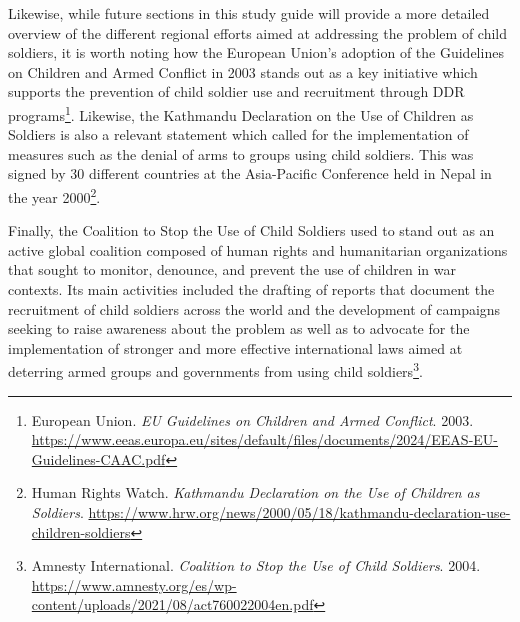 Likewise, while future sections in this study guide will provide a more detailed overview of the different regional efforts aimed at addressing the problem of child soldiers, it is worth noting how the European Union’s adoption of the Guidelines on Children and Armed Conflict in 2003 stands out as a key initiative which supports the prevention of child soldier use and recruitment through DDR programs\footnote{European Union. \emph{EU Guidelines on Children and Armed Conflict}. 2003. \url{https://www.eeas.europa.eu/sites/default/files/documents/2024/EEAS-EU-Guidelines-CAAC.pdf}}. Likewise, the Kathmandu Declaration on the Use of Children as Soldiers is also a relevant statement which called for the implementation of measures such as the denial of arms to groups using child soldiers. This was signed by 30 different countries at the Asia-Pacific Conference held in Nepal in the year 2000\footnote{Human Rights Watch. \emph{Kathmandu Declaration on the Use of Children as Soldiers}. \url{https://www.hrw.org/news/2000/05/18/kathmandu-declaration-use-children-soldiers}}.

Finally, the Coalition to Stop the Use of Child Soldiers used to stand out as an active global coalition composed of human rights and humanitarian organizations that sought to monitor, denounce, and prevent the use of children in war contexts. Its main activities included the drafting of reports that document the recruitment of child soldiers across the world and the development of campaigns seeking to raise awareness about the problem as well as to advocate for the implementation of stronger and more effective international laws aimed at deterring armed groups and governments from using child soldiers\footnote{Amnesty International. \emph{Coalition to Stop the Use of Child Soldiers}. 2004. \url{https://www.amnesty.org/es/wp-content/uploads/2021/08/act760022004en.pdf}}.
